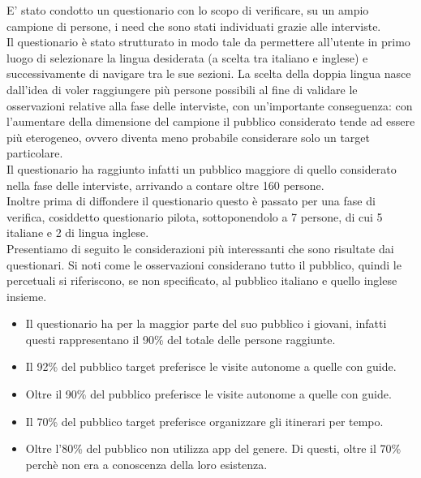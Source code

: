 E' stato condotto un questionario con lo scopo di verificare, su un ampio campione di persone, i need che sono stati individuati grazie alle interviste.\\

Il questionario è stato strutturato in modo tale da permettere all'utente in primo luogo di selezionare la lingua desiderata (a scelta tra italiano e inglese) e successivamente di navigare tra le sue sezioni. La scelta della doppia lingua nasce dall'idea di voler 
raggiungere più persone possibili al fine di validare le osservazioni relative alla fase delle interviste, con un'importante conseguenza: con l'aumentare della dimensione del campione il pubblico considerato tende ad essere più eterogeneo, ovvero diventa meno probabile considerare solo un target particolare. \\

Il questionario ha raggiunto infatti un pubblico maggiore di quello considerato nella fase delle interviste, arrivando a contare oltre 160 persone. \\

Inoltre prima di diffondere il questionario questo è passato per una fase di verifica, cosiddetto questionario pilota, sottoponendolo a 7 persone, di cui 5 italiane e 2 di lingua inglese.\\

Presentiamo di seguito le considerazioni più interessanti che sono risultate dai questionari. Si noti come le osservazioni considerano tutto il pubblico, quindi le percetuali si riferiscono, se non specificato, al pubblico italiano e quello inglese insieme.

\begin{itemize}

\item Il questionario ha per la maggior parte del suo pubblico i giovani, infatti questi rappresentano il 90\% del totale delle persone raggiunte.

\item Il 92\% del pubblico target preferisce le visite autonome a quelle con guide.

\item Oltre il 90\% del pubblico preferisce le visite autonome a quelle con guide.

\item Il 70\% del pubblico target preferisce organizzare gli itinerari per tempo.

\item Oltre l'80\% del pubblico non utilizza app del genere. Di questi, oltre il 70\% perchè non era a conoscenza della loro esistenza.

\end{itemize}

